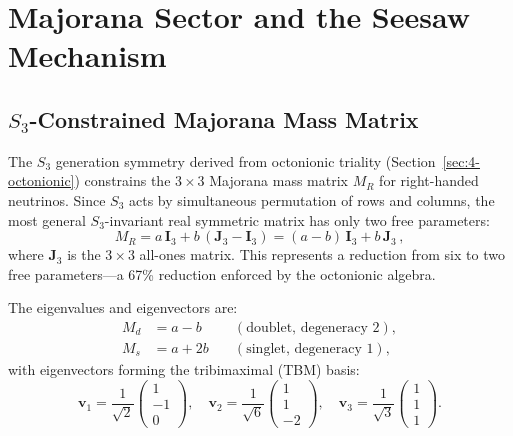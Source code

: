\section{Majorana Sector and the Seesaw Mechanism}
\label{sec:4-majorana}

\subsection{$S_3$-Constrained Majorana Mass Matrix}
\label{sec:4-s3-majorana}

The $S_3$ generation symmetry derived from octonionic triality (Section~\ref{sec:4-octonionic}) constrains the $3 \times 3$ Majorana mass matrix $M_R$ for right-handed neutrinos. Since $S_3$ acts by simultaneous permutation of rows and columns, the most general $S_3$-invariant real symmetric matrix has only two free parameters:
\begin{equation}
  M_R = a\, \mathbf{I}_3 + b\, (\mathbf{J}_3 - \mathbf{I}_3) = (a - b)\, \mathbf{I}_3 + b\, \mathbf{J}_3\,,
  \label{eq:4-84}
\end{equation}
where $\mathbf{J}_3$ is the $3 \times 3$ all-ones matrix. This represents a reduction from six to two free parameters---a 67\% reduction enforced by the octonionic algebra.

The eigenvalues and eigenvectors are:
\begin{equation}
\begin{aligned}
  M_d &= a - b \quad &(\text{doublet, degeneracy 2}),\\
  M_s &= a + 2b \quad &(\text{singlet, degeneracy 1}),
\end{aligned}
  \label{eq:4-85}
\end{equation}
with eigenvectors forming the tribimaximal (TBM) basis:
\begin{equation}
  \mathbf{v}_1 = \frac{1}{\sqrt{2}}\begin{pmatrix} 1\\-1\\0 \end{pmatrix}, \quad
  \mathbf{v}_2 = \frac{1}{\sqrt{6}}\begin{pmatrix} 1\\1\\-2 \end{pmatrix}, \quad
  \mathbf{v}_3 = \frac{1}{\sqrt{3}}\begin{pmatrix} 1\\1\\1 \end{pmatrix}.
  \label{eq:4-86}
\end{equation}

